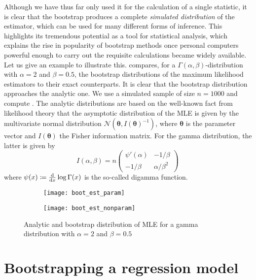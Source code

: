 \documentclass[a4paper]{book}
\begin{document}
Although we have thus far only used it for the calculation of a single statistic, it is clear that the bootstrap produces a complete \emph{simulated distribution} of the estimator, which can be used for many different forms of inference. This highlights its tremendous potential as a tool for statistical analysis, which explains the rise in popularity of bootstrap methods once personal computers powerful enough to carry out the requisite calculations became widely available. Let us give an example to illustrate this.  compares, for a $\Gamma(\alpha, \beta)$-distribution with $\alpha = 2$ and $\beta = 0.5$, the bootstrap distributions of the maximum likelihood estimators to their exact counterparts. It is clear that the bootstrap distribution approaches the analytic one. We use a simulated sample of size $n = 1000$ and compute . The analytic distributions are based on the well-known fact from likelihood theory that the asymptotic distribution of the MLE is given by the multivariate normal distribution $\mathcal{N}(\bm{\theta}, I(\bm{\theta})^{-1})$, where $\bm{\theta}$ is the parameter vector and $I(\bm{\theta})$ the Fisher information matrix. For the gamma distribution, the latter is given by
\begin{equation}
  I(\alpha, \beta) = n
  \begin{pmatrix}
      \psi'(\alpha) & -1 / \beta \\
      -1 / \beta & \alpha / \beta^2
  \end{pmatrix} \,
\end{equation}
where $\psi(x) \coloneqq \odv{}{x} \log \Gamma(x)$ is the so-called digamma function. 

\begin{landscape}
  \begin{figure}
    \begin{subfigure}{\linewidth}
      \texttt{[image: boot\_est\_param]}
    \end{subfigure}
    \begin{subfigure}{\linewidth}
      \texttt{[image: boot\_est\_nonparam]}
    \end{subfigure}
    \caption{Analytic and bootstrap distribution of MLE for a gamma distribution with $\alpha = 2$ and $\beta = 0.5$}
    \label{fig:boot-est}
  \end{figure}
\end{landscape}

\section{Bootstrapping a regression model} \label{sec:boot-reg}
\end{document}

